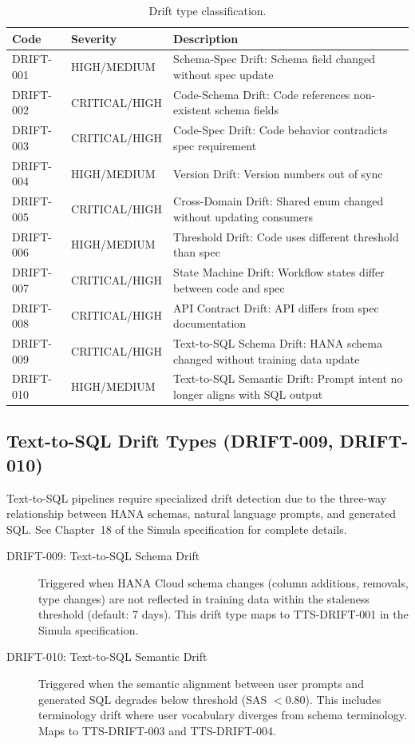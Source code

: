 \begin{table}[htbp]
\centering
\footnotesize
\caption{Drift type classification.}
\label{tab:drift-types}
\begin{tabularx}{\textwidth}{@{}l l X@{}}
\toprule
\textbf{Code} & \textbf{Severity} & \textbf{Description} \\
\midrule
DRIFT-001 & HIGH/MEDIUM & Schema-Spec Drift: Schema field changed without spec update \\
DRIFT-002 & CRITICAL/HIGH & Code-Schema Drift: Code references non-existent schema fields \\
DRIFT-003 & CRITICAL/HIGH & Code-Spec Drift: Code behavior contradicts spec requirement \\
DRIFT-004 & HIGH/MEDIUM & Version Drift: Version numbers out of sync \\
DRIFT-005 & CRITICAL/HIGH & Cross-Domain Drift: Shared enum changed without updating consumers \\
DRIFT-006 & HIGH/MEDIUM & Threshold Drift: Code uses different threshold than spec \\
DRIFT-007 & CRITICAL/HIGH & State Machine Drift: Workflow states differ between code and spec \\
DRIFT-008 & CRITICAL/HIGH & API Contract Drift: API differs from spec documentation \\
DRIFT-009 & CRITICAL/HIGH & Text-to-SQL Schema Drift: HANA schema changed without training data update \\
DRIFT-010 & HIGH/MEDIUM & Text-to-SQL Semantic Drift: Prompt intent no longer aligns with SQL output \\
\bottomrule
\end{tabularx}
\end{table}

\subsection{Text-to-SQL Drift Types (DRIFT-009, DRIFT-010)}

Text-to-SQL pipelines require specialized drift detection due to the three-way
relationship between HANA schemas, natural language prompts, and generated SQL.
See Chapter~18 of the Simula specification for complete details.

\begin{description}
  \item[DRIFT-009: Text-to-SQL Schema Drift] Triggered when HANA Cloud schema
    changes (column additions, removals, type changes) are not reflected in
    training data within the staleness threshold (default: 7 days). This drift
    type maps to TTS-DRIFT-001 in the Simula specification.
    
  \item[DRIFT-010: Text-to-SQL Semantic Drift] Triggered when the semantic
    alignment between user prompts and generated SQL degrades below threshold
    (SAS $< 0.80$). This includes terminology drift where user vocabulary
    diverges from schema terminology. Maps to TTS-DRIFT-003 and TTS-DRIFT-004.
\end{description}

